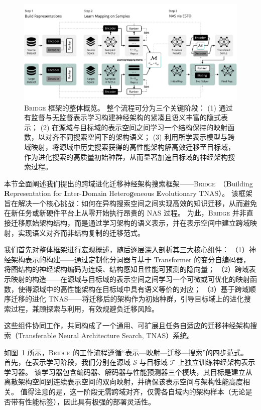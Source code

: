 \documentclass[../main.tex]{subfiles}
\begin{document}
\begin{figure}[htbp]
	\centering
	\includegraphics[width=\textwidth]{BRIDGE/overview-fixed.pdf}
	\caption{
		\textsc{Bridge} 框架的整体概览。
		整个流程可分为三个关键阶段：
		(1) 通过有监督与无监督表示学习构建神经架构的紧凑且语义丰富的隐式表示；
		(2) 在源域与目标域的表示空间之间学习一个结构保持的映射函数，以对齐不同搜索空间下的架构语义；
		(3) 利用所学表示模型与跨域映射，将源域中历史搜索获得的高性能架构解高效迁移至目标域，作为进化搜索的高质量初始种群，从而显著加速目标域的神经架构搜索过程。
	}\label{fig:overview}
\end{figure}

本节全面阐述我们提出的跨域进化迁移神经架构搜索框架——\textsc{Bridge}~（\textbf{B}uilding \textbf{R}epresentation for \textbf{I}nter-\textbf{D}omain Hetero\textbf{g}eneous \textbf{E}volutionary TNAS）。
该框架旨在解决一个核心挑战：如何在异构搜索空间之间实现高效的知识迁移，从而避免在新任务或新硬件平台上从零开始执行昂贵的 NAS 过程。
为此，\textsc{Bridge} 并非直接迁移原始架构结构，而是通过学习架构的语义表示，并在表示空间中建立跨域映射，实现语义对齐而非结构复制的迁移范式。

我们首先对整体框架进行宏观概述，随后逐层深入剖析其三大核心组件：
（1）神经架构表示的构建——通过定制化分词器与基于 Transformer 的变分自编码器，将图结构的神经架构编码为连续、结构感知且性能可预测的隐向量；
（2）跨域表示映射的构造——在源域与目标域的表示空间之间学习一个可微或可优化的映射函数，使得源域中的高性能架构在目标域中具有语义等价的对应；
（3）基于跨域顺序迁移的进化 TNAS——将迁移后的架构作为初始种群，引导目标域上的进化搜索过程，兼顾探索与利用，有效规避负迁移风险。

这些组件协同工作，共同构成了一个通用、可扩展且任务自适应的迁移神经架构搜索（Transferable Neural Architecture Search, TNAS）系统。

如图~\ref{fig:overview} 所示，\textsc{Bridge} 的工作流程遵循“表示—映射—迁移—搜索”的四步范式。
首先，在表示学习阶段，我们分别在源域 $\mathcal{S}$ 与目标域 $\mathcal{T}$ 上独立训练神经架构表示学习器。
该学习器包含编码器、解码器与性能预测器三个模块，其目标是建立从离散架构空间到连续表示空间的双向映射，并确保该表示空间与架构性能高度相关。
值得注意的是，这一阶段无需跨域对齐，仅需各自域内的架构样本（无论是否带有性能标签），因此具有极强的部署灵活性。
\end{document}
